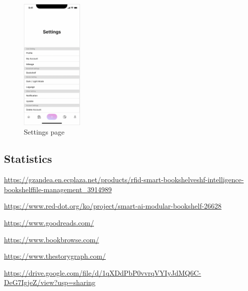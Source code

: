 \documentclass[conference]{IEEEtran}
\begin{document}
\begin{figure}[h]
    \centering
    \includegraphics[width=3cm]{Ressources/Specifications/settings.png}
    \caption{Settings page}
    \label{fig:settings}
\end{figure}

\subsection{Statistics}














\begin{thebibliography}{00}
\url{https://gzandea.en.ecplaza.net/products/rfid-smart-bookshelveshf-intelligence-bookshelffile-management_3914989}

\url{https://www.red-dot.org/ko/project/smart-ai-modular-bookshelf-26628}

\url{https://www.goodreads.com/}

\url{https://www.bookbrowse.com/}

\url{https://www.thestorygraph.com/}

\url{https://drive.google.com/file/d/1qXDdPbP0vvrqVYIyJdMQ6C-DeG7IgjeZ/view?usp=sharing}

\end{thebibliography}
\end{document}
